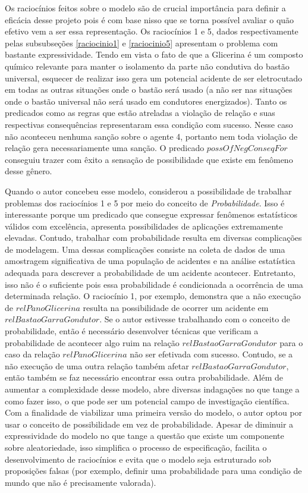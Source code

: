Os raciocínios feitos sobre o modelo são de crucial importância para definir a eficácia desse projeto pois é com base nisso que se torna possível avaliar o quão efetivo vem a ser essa representação. Os raciocínios 1 e 5, dados respectivamente pelas subsubseções \ref{raciocinio1} e \ref{raciocinio5} apresentam o problema com bastante expressividade. Tendo em vista o fato de que a Glicerina  é um composto químico relevante para manter o isolamento da parte não condutiva do bastão universal, esquecer de realizar isso gera um potencial acidente de ser eletrocutado em todas as outras situações onde o bastão será usado (a não ser nas situações onde o bastão universal não será usado em condutores energizados). Tanto os predicados como as regras que estão atreladas a violação de relação e suas respectivas consequências representaram essa condição com sucesso. Nesse caso não aconteceu nenhuma sanção sobre o agente 4, portanto nem toda violação de relação gera necessariamente uma sanção. O predicado $possOfNegConseqFor$ conseguiu trazer com êxito a sensação de possibilidade que existe em fenômeno desse gênero. 

Quando o autor concebeu esse modelo, considerou a possibilidade de trabalhar problemas dos raciocínios 1 e 5 por meio do conceito de \textit{Probabilidade}. Isso é interessante porque um predicado que consegue expressar fenômenos estatísticos válidos com excelência, apresenta possibilidades de aplicações extremamente elevadas. Contudo, trabalhar com probabilidade resulta em diversas complicações de modelagem. Uma dessas complicações consiste na coleta de dados de uma amostragem significativa de uma população de acidentes e na análise estatística adequada para descrever a probabilidade de um acidente acontecer. Entretanto, isso não é o suficiente pois essa probabilidade é condicionada a ocorrência de uma determinada relação. O raciocínio 1, por exemplo, demonstra que a não execução de $relPanoGlicerina$ resulta na possibilidade de ocorrer um acidente em $relBastaoGarraGondutor$. Se o autor estivesse trabalhando com o conceito de probabilidade, então é necessário desenvolver técnicas que verificam a probabilidade de acontecer algo ruim na relação $relBastaoGarraGondutor$ para o caso da relação $relPanoGlicerina$ não ser efetivada com sucesso. Contudo, se a não execução de uma outra relação também afetar $relBastaoGarraGondutor$, então também se faz necessário encontrar essa outra probabilidade. Além de aumentar a complexidade desse modelo, abre diversas indagações no que tange a como fazer isso, o que pode ser um potencial campo de investigação científica. Com a finalidade de viabilizar uma primeira versão do modelo, o autor optou por usar o conceito de possibilidade em vez de probabilidade. Apesar de diminuir a expressividade do modelo no que tange a questão que existe um componente sobre aleatoriedade, isso simplifica o processo de especificação, facilita o desenvolvimento de raciocínios e evita que o modelo seja estruturado sob proposições falsas (por exemplo, definir uma probabilidade para uma condição de mundo que não é precisamente valorada). 

